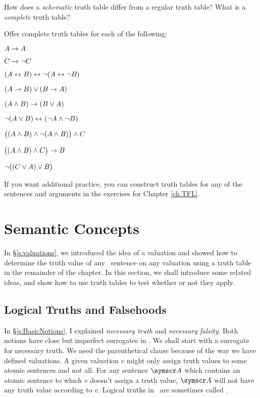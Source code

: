 \label{pr.TT.TTorC.p}\practiceproblems
\problempart
How does a \emph{schematic} truth table differ from a regular truth table? What is a \emph{complete} truth table?

\problempart\label{pr.TT.TTorC}
Offer complete truth tables for each of the following: 
\begin{earg}
\item $A \rightarrow A$ %
\item $C \rightarrow\neg C$ %
\item $(A \leftrightarrow B) \leftrightarrow \neg(A\leftrightarrow \neg B)$ %
\item $(A \rightarrow B) \vee (B \rightarrow A)$ %
\item $(A \wedge B) \rightarrow (B \vee A)$  %
\item $\neg(A \vee B) \leftrightarrow (\neg A \wedge \neg B)$ %
\item $\bigl( (A\wedge B) \wedge\neg(A\wedge B) \bigr) \wedge C$ %
\item $\bigl( (A \wedge B) \wedge C\bigr) \rightarrow B$ %
\item $\neg\bigl( (C\vee A) \vee B\bigr)$ %
\end{earg}

If you want additional practice, you can construct truth tables for any of the sentences and arguments in the exercises for Chapter \ref{ch.TFL}.


\chapter{Semantic Concepts}\label{s:Semantic.concepts}
In §\ref{s:valuations}, we introduced the idea of a valuation and showed how to determine the truth value of any \TFL\ sentence on any valuation using a truth table in the remainder of the chapter. In this section, we shall introduce some related ideas, and show how to use truth tables to test whether or not they apply.


\section{Logical Truths and Falsehoods}
In §\ref{s:BasicNotions}, I explained \emph{necessary truth} and \emph{necessary falsity}. Both notions have close but imperfect surrogates in \TFL. We shall start with a surrogate for necessary truth.
We need the parenthetical clause because of the way we have defined valuations. A given valuation $v$ might only assign truth values to some atomic sentences and not all. For any sentence $\meta{A}$ which contains an atomic sentence to which $v$ doesn't assign a truth value, $\meta{A}$ will not have any truth value according to $v$. Logical truths in \TFL\ are sometimes called .

